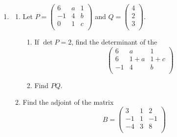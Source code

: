 \documentclass[11pt,a4paper]{article}
\begin{document}
\begin{enumerate}
\begin{enumerate}
\begin{enumerate}
\item \hspace{0.4cm}
$
\begin{matrix}
x & - & y & + & 2z & =-5\\
&&-x & + & 3z & =0\\
&& 2x & + & y & = 1\\
\end{matrix}
$\\\\
\end{enumerate}
\end{enumerate}



\item
\begin{enumerate}
\item Let $P=
\begin{pmatrix}
6 & a & 1\\
-1 & 4 & b \\
0 & 1 & c\\
\end{pmatrix}
$ and $
Q=
\begin{pmatrix}
4\\ 2\\3\\
\end{pmatrix}
$.\\


\begin{enumerate}
\item If $\det P =2$, find the determinant of the $$
\begin{pmatrix}
6 & a & 1\\
6 & 1+a & 1+c\\
-1 & 4 & b\\
\end{pmatrix}
$$
\item Find $PQ$.\\
\end{enumerate}


\item Find the adjoint of the matrix $$B=
\begin{pmatrix}
3 & 1 & 2\\
-1 & 1 & -1\\
-4 & 3 & 8\\
\end{pmatrix}
$$\\
\end{enumerate}


\end{enumerate}
\end{document}

